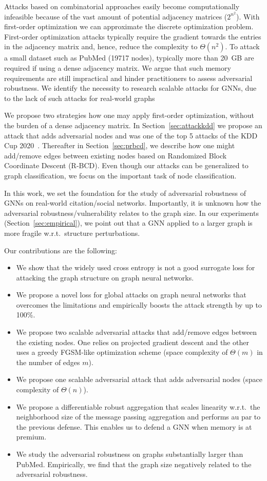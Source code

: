 \documentclass[sigconf,authordraft]{acmart}
\begin{document}
Attacks based on combinatorial approaches easily become computationally infeasible because of the vast amount of potential adjacency matrices (\(2^{n^2}\)). With first-order optimization we can approximate the discrete optimization problem. First-order optimization attacks typically require the gradient towards the entries in the adjacency matrix and, hence, reduce the complexity to \(\Theta(n^2)\). To attack a small dataset such as PubMed (19717 nodes), typically more than 20~GB are required if using a dense adjacency matrix. We argue that such memory requirements are still impractical and hinder practitioners to assess adversarial robustness. We identify the necessity to research scalable attacks for GNNs, due to the lack of such attacks for real-world graphs

We propose two strategies how one may apply first-order optimization, without the burden of a dense adjacency matrix. In Section~\ref{sec:attackkdd} we propose an attack that adds adversarial nodes and was one of the top 5 attacks of the KDD Cup 2020~\citep{Biendata2020}. Thereafter in Section~\ref{sec:prbcd}, we describe how one might add/remove edges between existing nodes based on Randomized Block Coordinate Descent (R-BCD). Even though our attacks can be generalized to graph classification, we focus on the important task of node classification.

In this work, we set the foundation for the study of adversarial robustness of GNNs on real-world citation/social networks. Importantly, it is unknown how the adversarial robustness/vulnerability relates to the graph size. In our experiments (Section~\ref{sec:empirical}), we point out that a GNN applied to a larger graph is more fragile w.r.t.\ structure perturbations.

Our contributions are the following:
\begin{itemize}
  \item We show that the widely used cross entropy is not a good surrogate loss for attacking the graph structure on graph neural networks.
  \item We propose a novel loss for global attacks on graph neural networks that overcomes the limitations and empirically boosts the attack strength by up to 100\%.
  \item We propose two scalable adversarial attacks that add/remove edges between the existing nodes. One relies on projected gradient descent and the other uses a greedy FGSM-like optimization scheme (space complexity of \(\Theta(m)\) in the number of edges \(m\)).
  \item We propose one scalable adversarial attack that adds adversarial nodes (space complexity of \(\Theta(n)\)).
  \item We propose a differentiable robust aggregation that scales linearity w.r.t.\ the neighborhood size of the message passing aggregation and performs au par to the previous defense. This enables us to defend a GNN when memory is at premium.
  \item We study the adversarial robustness on graphs substantially larger than PubMed. Empirically, we find that the graph size negatively related to the adversarial robustness.
\end{itemize}
\end{document}
